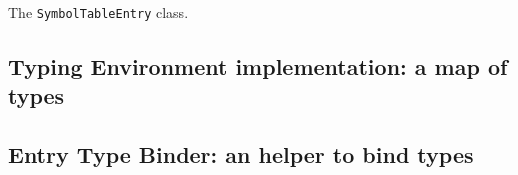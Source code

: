 \begin{Listing}[tbh]
    \centering
    \caption{The \texttt{SymbolTableEntry} class.}
    \label{lst:impl:SymbolTableEntry}
\end{Listing}

\subsection{Typing Environment implementation: a map of types}\label{subsec:impl:TypingEnvironment}

\subsection{Entry Type Binder: an helper to bind types}\label{subsec:impl:EntryTypeBinder}

